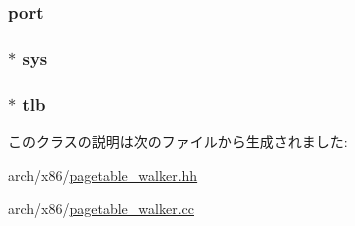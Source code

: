 \hypertarget{classX86ISA_1_1Walker_a5934d4dbd0362d5d5d65c63ff6f247b0}{
\subsubsection[{port}]{ {\bf port}}}
\label{classX86ISA_1_1Walker_a5934d4dbd0362d5d5d65c63ff6f247b0}
\hypertarget{classX86ISA_1_1Walker_a8ae37465ba84acfef6af3e9b9e6dbbd5}{
\subsubsection[{sys}]{$\ast$ {\bf sys}}}
\label{classX86ISA_1_1Walker_a8ae37465ba84acfef6af3e9b9e6dbbd5}
\hypertarget{classX86ISA_1_1Walker_a9f0e11329a702fd34819769c899e4bd3}{
\subsubsection[{tlb}]{$\ast$ {\bf tlb}}}
\label{classX86ISA_1_1Walker_a9f0e11329a702fd34819769c899e4bd3}


このクラスの説明は次のファイルから生成されました:\begin{DoxyCompactItemize}
\item 
arch/x86/\hyperlink{pagetable__walker_8hh}{pagetable\_\-walker.hh}\item 
arch/x86/\hyperlink{pagetable__walker_8cc}{pagetable\_\-walker.cc}\end{DoxyCompactItemize}

